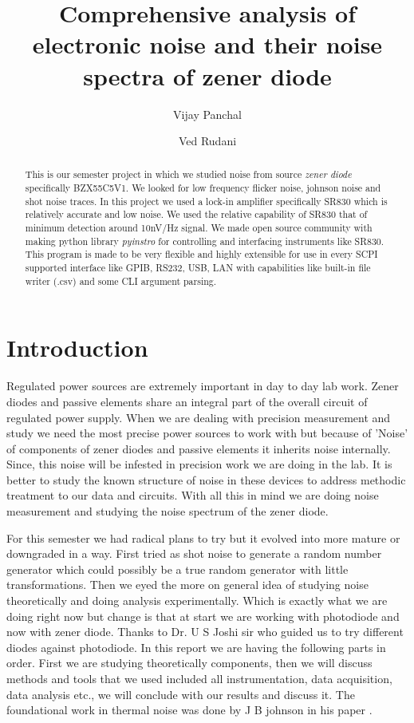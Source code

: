 \documentclass[final,5p,12pt,twocolumn]{elsaarticle}
\begin{document}
\title{Comprehensive analysis of electronic noise and their noise spectra of zener diode}
\author{Vijay Panchal}
\author{Ved Rudani}
\address{Department of Physics, Electronics and Space Sciences, Gujarat University, Ahmedabad, India}

\begin{abstract}
    This is our semester project in which we studied noise from source \emph{zener diode} specifically BZX55C5V1. We looked for low frequency flicker noise, johnson noise and shot noise traces. In this project we used a lock-in amplifier specifically SR830 which is relatively accurate and low noise. We used the relative capability of SR830 that of minimum detection around 10nV/Hz signal. We made open source community with making python library \emph{pyinstro} for controlling and interfacing instruments like SR830. This program is made to be very flexible and highly extensible for use in every SCPI supported interface like GPIB, RS232, USB, LAN with capabilities like built-in file writer (.csv) and some CLI argument parsing.
\end{abstract}

\maketitle

\section{Introduction}\label{introduction}
Regulated power sources are extremely important in day to day lab work. Zener diodes and passive elements share an integral part of the overall circuit of regulated power supply.  When we are dealing with precision measurement and study we need the most precise power sources to work with but because of 'Noise' of components of zener diodes and passive elements it inherits noise internally. Since, this noise will be infested in precision work we are doing in the lab. It is better to study the known structure of noise in these devices to address methodic treatment to our data and circuits. With all this in mind we are doing noise measurement and studying the noise spectrum of the zener diode.



For this semester we had radical plans to try but it evolved into more mature or downgraded in a way. First tried as shot noise to generate a random number generator which could possibly be a true random generator with little transformations. Then we eyed the more on general idea of studying noise theoretically and doing analysis experimentally. Which is exactly what we are doing right now but change is that at start we are working with photodiode and now with zener diode. Thanks to Dr. U S Joshi sir who guided us to try different diodes against photodiode. In this report we are having the following parts in order. First we are studying theoretically components, then we will discuss methods and tools that we used included all instrumentation, data acquisition, data analysis etc., we will conclude with our results and discuss it. The foundational work in thermal noise was done by J B johnson in his paper \citep{johnson1928thermal}. 
\end{document}
